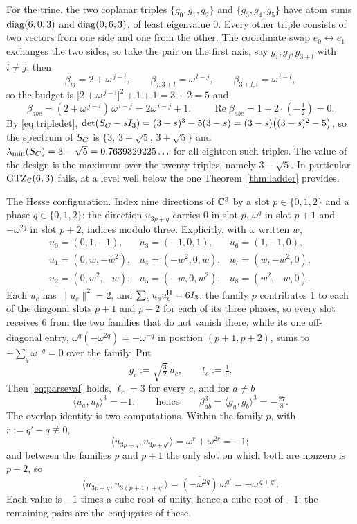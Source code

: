 For the trine, the two coplanar triples $\{g_0,g_1,g_2\}$ and
$\{g_3,g_4,g_5\}$ have atom sums $\operatorname{diag}(6,0,3)$ and $\operatorname{diag}(0,6,3)$, of
least eigenvalue $0$.  Every other triple consists of two vectors from one
side and one from the other.  The coordinate swap $e_0\leftrightarrow e_1$
exchanges the two sides, so take the pair on the first axis, say
$g_i,g_j,g_{3+l}$ with $i\ne j$; then
\[
  \beta_{ij}=2+\omega^{\,j-i},
  \qquad
  \beta_{j,3+l}=\omega^{\,l-j},
  \qquad
  \beta_{3+l,i}=\omega^{\,i-l},
\]
so the budget is $\lvert2+\omega^{\,j-i}\rvert^{2}+1+1=3+2=5$ and
\[
  \beta_{abc}=(2+\omega^{\,j-i})\,\omega^{\,i-j}=2\omega^{\,i-j}+1,
  \qquad \operatorname{Re}\beta_{abc}=1+2\cdot(-\tfrac12)=0 .
\]
By \eqref{eq:tripledet},
$\det(S_{C}-sI_3)=(3-s)^{3}-5(3-s)=(3-s)\bigl((3-s)^{2}-5\bigr)$, so the
spectrum of $S_{C}$ is $\{3,\,3-\sqrt5,\,3+\sqrt5\}$ and
$\lambda_{\min}(S_{C})=3-\sqrt5=0.7639320225\ldots$ for all eighteen such triples.
The value of the design is the maximum over the twenty triples, namely
$3-\sqrt5$.  In particular $\mathrm{GTZ}_{\mathbb{C}}(6,3)$ fails, at a level well below the
one Theorem~\ref{thm:ladder} provides.

\begin{example}[Lean]\label{ex:hesse}
The Hesse configuration.  Index nine directions of $\mathbb{C}^{3}$ by a slot
$p\in\{0,1,2\}$ and a phase $q\in\{0,1,2\}$: the direction $u_{3p+q}$
carries $0$ in slot $p$, $\omega^{q}$ in slot $p+1$ and $-\omega^{2q}$ in
slot $p+2$, indices modulo three.  Explicitly, with $\omega$ written $w$,
\[
  \begin{array}{lll}
    u_0=(0,1,-1), & u_3=(-1,0,1), & u_6=(1,-1,0),\\
    u_1=(0,w,-w^{2}), & u_4=(-w^{2},0,w), & u_7=(w,-w^{2},0),\\
    u_2=(0,w^{2},-w), & u_5=(-w,0,w^{2}), & u_8=(w^{2},-w,0).
  \end{array}
\]
Each $u_c$ has $\lVert u_c\rVert^{2}=2$, and
$\sum_c u_c^{\vphantom{\mathsf{H}}}u_c\adj=6I_3$: the family $p$ contributes $1$ to
each of the diagonal slots $p+1$ and $p+2$ for each of its three phases,
so every slot receives $6$ from the two families that do not vanish there,
while its one off-diagonal entry,
$\omega^{q}\overline{(-\omega^{2q})}=-\omega^{-q}$ in position
$(p+1,p+2)$, sums to $-\sum_q\omega^{-q}=0$ over the family.  Put
\[
  g_c:=\sqrt{\tfrac32}\,u_c,\qquad t_c:=\tfrac19 .
\]
Then \eqref{eq:parseval} holds, $\ell_c=3$ for every $c$, and for $a\ne b$
\[
  \langle u_a,u_b\rangle^{3}=-1,
  \qquad\text{hence}\qquad
  \beta_{ab}^{3}=\langle g_a,g_b\rangle^{3}=-\tfrac{27}8 .
\]
The overlap identity is two computations.  Within the family $p$, with
$r:=q'-q\not\equiv0$,
\[
  \langle u_{3p+q},u_{3p+q'}\rangle=\omega^{r}+\omega^{2r}=-1 ;
\]
and between the families $p$ and $p+1$ the only slot on which both are
nonzero is $p+2$, so
\[
  \langle u_{3p+q},u_{3(p+1)+q'}\rangle
  =\overline{(-\omega^{2q})}\,\omega^{q'}=-\omega^{\,q+q'} .
\]
Each value is $-1$ times a cube root of unity, hence a cube root of $-1$;
the remaining pairs are the conjugates of these.
\end{example}

